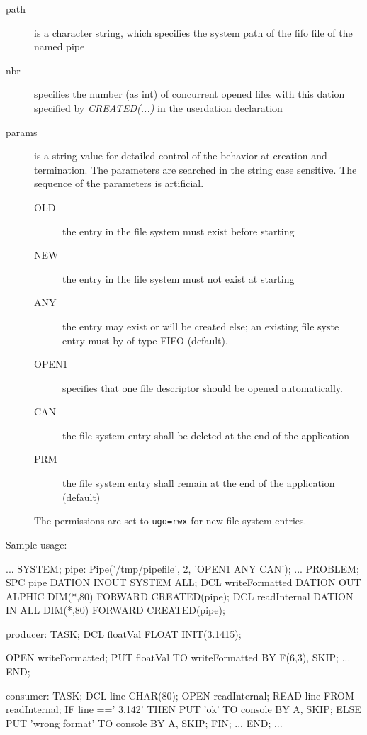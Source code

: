 \begin{description}
\item [path] is a character string,
     which specifies the system path of the fifo file
    of the named pipe
\item[nbr] specifies the number (as int) of concurrent opened files with this dation
     specified by {\em CREATED(...)} in the userdation declaration
\item [params] is a string value for detailed control of the behavior
     at creation and termination. The parameters are searched in the string
     case sensitive. The sequence of the parameters is artificial.
   \begin{description}
     \item[OLD] the entry in the file system must exist before starting
     \item[NEW] the entry in the file system must not exist at starting
     \item[ANY] the entry may exist or will be created else; an existing
                file syste entry must by of type FIFO (default).
     \item[OPEN1] specifies that one file descriptor should be opened 
                automatically.
     \item[CAN] the file system entry shall be deleted at the end of the 
                application
     \item[PRM] the file system entry shall remain at the end of the
                application (default)
   \end{description} 
   The permissions are set to \verb|ugo=rwx| for new file system entries.
\end{description}

Sample usage:
\begin{PEARLCode}
...
SYSTEM;
   pipe: Pipe('/tmp/pipefile', 2, 'OPEN1 ANY CAN');
...
PROBLEM;
   SPC pipe DATION INOUT SYSTEM ALL;
   DCL writeFormatted DATION OUT ALPHIC DIM(*,80) FORWARD CREATED(pipe);
   DCL readInternal   DATION IN  ALL    DIM(*,80) FORWARD CREATED(pipe);

producer: TASK;
   DCL floatVal FLOAT INIT(3.1415);

   OPEN writeFormatted;
   PUT  floatVal TO writeFormatted BY F(6,3), SKIP;
...
END;

consumer: TASK;
   DCL line CHAR(80);
   OPEN readInternal;
   READ line FROM readInternal;
   IF line ==' 3.142' THEN
      PUT 'ok' TO console BY A, SKIP;
   ELSE
      PUT 'wrong format' TO console BY A, SKIP;
   FIN;
...
END;
...
\end{PEARLCode}

